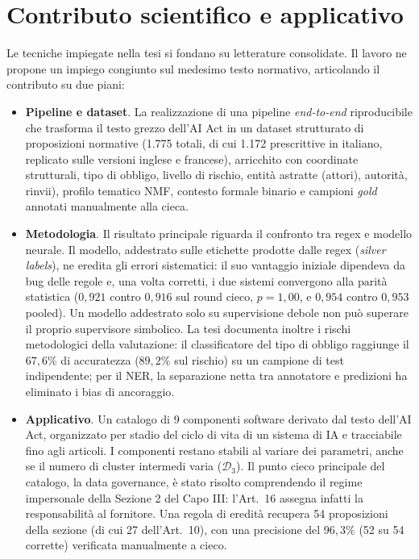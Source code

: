 \documentclass[12pt,a4paper,oneside]{report}
\begin{document}
\section{Contributo scientifico e applicativo}
\label{sec:contributo}
Le tecniche impiegate nella tesi si fondano su letterature consolidate. Il lavoro ne propone un impiego congiunto sul medesimo testo normativo, articolando il contributo su due piani:

\begin{itemize}
    \item \textbf{Pipeline e dataset}. La realizzazione di una pipeline \emph{end-to-end} riproducibile che trasforma il testo grezzo dell'AI Act in un dataset strutturato di proposizioni normative (1.775 totali, di cui 1.172 prescrittive in italiano, replicato sulle versioni inglese e francese), arricchito con coordinate strutturali, tipo di obbligo, livello di rischio, entità astratte (attori), autorità, rinvii), profilo tematico NMF, contesto formale binario e campioni \emph{gold} annotati manualmente alla cieca.
    
    \item \textbf{Metodologia}. Il risultato principale riguarda il confronto tra regex e modello neurale. Il modello, addestrato sulle etichette prodotte dalle regex (\textit{silver labels}), ne eredita gli errori sistematici: il suo vantaggio iniziale dipendeva da bug delle regole e, una volta corretti, i due sistemi convergono alla parità statistica ($0{,}921$ contro $0{,}916$ sul round cieco, $p = 1{,}00$, e $0{,}954$ contro $0{,}953$ pooled). Un modello addestrato solo su supervisione debole non può superare il proprio supervisore simbolico.
    La tesi documenta inoltre i rischi metodologici della valutazione: il classificatore del tipo di obbligo raggiunge il $67{,}6\%$ di accuratezza ($89{,}2\%$ sul rischio) su un campione di test indipendente; per il NER, la separazione netta tra annotatore e predizioni ha eliminato i bias di ancoraggio.
    
    \item \textbf{Applicativo}. Un catalogo di 9 componenti software derivato dal testo dell'AI Act, organizzato per stadio del ciclo di vita di un sistema di IA e tracciabile fino agli articoli. I componenti restano stabili al variare dei parametri, anche se il numero di cluster intermedi varia ($\mathcal{D}_3$). Il punto cieco principale del catalogo, la data governance, è stato risolto comprendendo il regime impersonale della Sezione 2 del Capo III: l'Art.~16 assegna infatti la responsabilità al fornitore. Una regola di eredità recupera 54 proposizioni della sezione (di cui 27 dell'Art.~10), con una precisione del $96{,}3\%$ (52 su 54 corrette) verificata manualmente a cieco.
\end{itemize}
\end{document}
